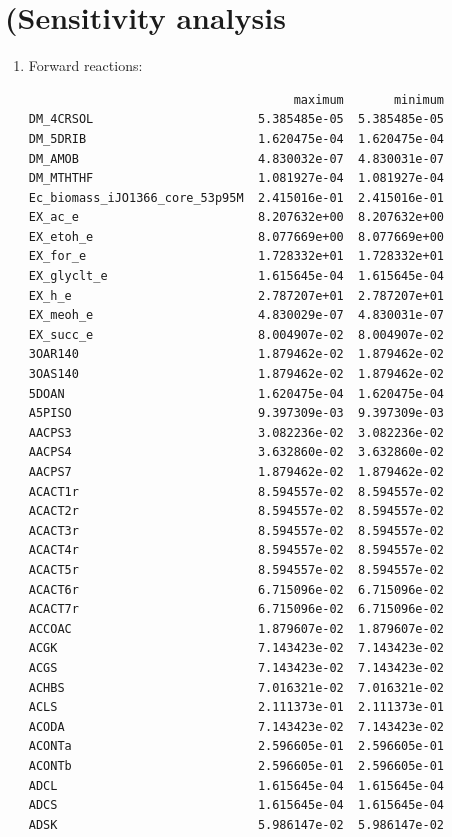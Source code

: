\documentclass{scrartcl}
\begin{document}
\section{(Sensitivity analysis}
\begin{enumerate}
\item Forward reactions:
\begin{lstlisting}
                                     maximum       minimum
DM_4CRSOL                       5.385485e-05  5.385485e-05
DM_5DRIB                        1.620475e-04  1.620475e-04
DM_AMOB                         4.830032e-07  4.830031e-07
DM_MTHTHF                       1.081927e-04  1.081927e-04
Ec_biomass_iJO1366_core_53p95M  2.415016e-01  2.415016e-01
EX_ac_e                         8.207632e+00  8.207632e+00
EX_etoh_e                       8.077669e+00  8.077669e+00
EX_for_e                        1.728332e+01  1.728332e+01
EX_glyclt_e                     1.615645e-04  1.615645e-04
EX_h_e                          2.787207e+01  2.787207e+01
EX_meoh_e                       4.830029e-07  4.830031e-07
EX_succ_e                       8.004907e-02  8.004907e-02
3OAR140                         1.879462e-02  1.879462e-02
3OAS140                         1.879462e-02  1.879462e-02
5DOAN                           1.620475e-04  1.620475e-04
A5PISO                          9.397309e-03  9.397309e-03
AACPS3                          3.082236e-02  3.082236e-02
AACPS4                          3.632860e-02  3.632860e-02
AACPS7                          1.879462e-02  1.879462e-02
ACACT1r                         8.594557e-02  8.594557e-02
ACACT2r                         8.594557e-02  8.594557e-02
ACACT3r                         8.594557e-02  8.594557e-02
ACACT4r                         8.594557e-02  8.594557e-02
ACACT5r                         8.594557e-02  8.594557e-02
ACACT6r                         6.715096e-02  6.715096e-02
ACACT7r                         6.715096e-02  6.715096e-02
ACCOAC                          1.879607e-02  1.879607e-02
ACGK                            7.143423e-02  7.143423e-02
ACGS                            7.143423e-02  7.143423e-02
ACHBS                           7.016321e-02  7.016321e-02
ACLS                            2.111373e-01  2.111373e-01
ACODA                           7.143423e-02  7.143423e-02
ACONTa                          2.596605e-01  2.596605e-01
ACONTb                          2.596605e-01  2.596605e-01
ADCL                            1.615645e-04  1.615645e-04
ADCS                            1.615645e-04  1.615645e-04
ADSK                            5.986147e-02  5.986147e-02

\end{lstlisting}
\end{enumerate}
\end{document}
